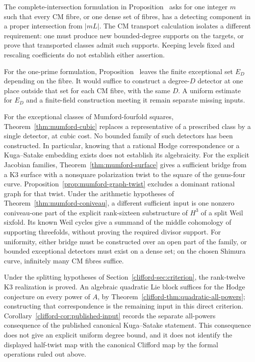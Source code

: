 \documentclass[11pt]{article}
\theoremstyle{definition}
\theoremstyle{remark}
\begin{document}
The complete-intersection formulation in Proposition~ asks for one integer $m$ such that every CM fibre, or one dense set of fibres, has a detecting component in a proper intersection from $|mL|$. The CM transport calculation isolates a different requirement: one must produce new bounded-degree supports on the targets, or prove that transported classes admit such supports. Keeping levels fixed and rescaling coefficients do not establish either assertion.

For the one-prime formulation, Proposition~ leaves the finite exceptional set $E_D$ depending on the fibre. It would suffice to construct a degree-$D$ detector at one place outside that set for each CM fibre, with the same $D$. A uniform estimate for $E_D$ and a finite-field construction meeting it remain separate missing inputs.


For the exceptional classes of Mumford-fourfold squares, Theorem~\ref{thm:mumford-cubic} replaces a representative of a prescribed class by a single detector, at cubic cost. No bounded family of such detectors has been constructed. In particular, knowing that a rational Hodge correspondence or a Kuga--Satake embedding exists does not establish its algebraicity. For the explicit Jacobian families, Theorem~\ref{thm:mumford-surface} gives a sufficient bridge from a K3 surface with a nonsquare polarization twist to the square of the genus-four curve. Proposition~\ref{prop:mumford-graph-twist} excludes a dominant rational graph for that twist. Under the arithmetic hypotheses of Theorem~\ref{thm:mumford-coniveau}, a different sufficient input is one nonzero coniveau-one part of the explicit rank-sixteen substructure of $H^3$ of a split Weil sixfold. Its known Weil cycles give a summand of the middle cohomology of supporting threefolds, without proving the required divisor support. For uniformity, either bridge must be constructed over an open part of the family, or bounded exceptional detectors must exist on a dense set; on the chosen Shimura curve, infinitely many CM fibres suffice.

Under the splitting hypotheses of Section~\ref{clifford-sec:criterion},
the rank-twelve K3 realization is proved.  An algebraic quadratic Lie
block suffices for the Hodge conjecture on every power of $A$, by
Theorem~\ref{clifford-thm:quadratic-all-powers}; constructing that
correspondence is the remaining input in this direct criterion.
Corollary~\ref{clifford-cor:published-input} records the separate
all-powers consequence of the published canonical Kuga--Satake statement.
This consequence does not give an explicit uniform degree bound, and
it does not identify the displayed half-twist map with the canonical
Clifford map by the formal operations ruled out above.
\end{document}
